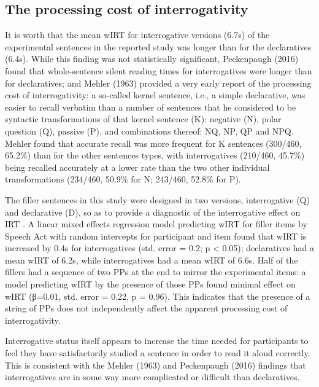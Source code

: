 \documentclass[12pt,oneside]{book}
\begin{document}
\hypertarget{qslow}{%
\subsection{The processing cost of interrogativity}\label{qslow}}

It is worth  that the mean wIRT for interrogative versions (6.7s) of the experimental sentences in the reported study was longer than for the declaratives (6.4s). While this finding was not statistically significant, Peckenpaugh (2016) found that whole-sentence silent reading times for interrogatives were longer than for declaratives; and Mehler (1963) provided a very early report of the processing cost of interrogativity: a so-called kernel sentence, i.e., a simple declarative, was easier to recall verbatim than  a number of sentences that he considered to be syntactic transformations of that kernel sentence (K): negative (N), polar question (Q), passive (P), and combinations thereof: NQ, NP, QP and NPQ. Mehler found that accurate recall was more frequent for K sentences (300/460, 65.2\%) than for the other sentences types, with interrogatives (210/460, 45.7\%) being recalled accurately at a lower rate than the two other individual transformations (234/460, 50.9\% for N; 243/460, 52.8\% for P).

The filler sentences in this study were designed in two versions, interrogative (Q) and declarative (D), so as to provide a diagnostic of the interrogative effect on IRT . A linear mixed effects regression model predicting wIRT for filler items by Speech Act with random intercepts for participant and item found that wIRT is increased by 0.4s for interrogatives (std. error = 0.2; p \textless{} 0.05); declaratives had a mean wIRT of 6.2s, while interrogatives had a mean wIRT of 6.6s. Half of the fillers had a sequence of two PPs at the end  to mirror the experimental items: a model predicting wIRT by the presence of those PPs found minimal effect on wIRT (β=0.01, std. error = 0.22, p = 0.96). This indicates that the presence of a string of PPs does not independently affect the apparent processing cost of interrogativity.

Interrogative status itself appears to increase the time needed for participants to feel they have satisfactorily studied a sentence in order to read it aloud correctly. This is consistent with the Mehler (1963) and Peckenpaugh (2016) findings that interrogatives are in some way more complicated or difficult than declaratives.
\end{document}
